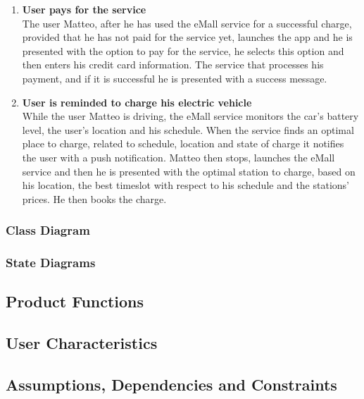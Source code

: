 \begin{enumerate}
    \item \textbf{User pays for the service}\\
    The user Matteo, after he has used the eMall service for a successful charge, provided that he has not paid for the service yet,
    launches the app and he is presented with the option to pay for the service, 
    he selects this option and then enters his credit card information.
    The service that processes his payment, and if it is successful he is presented with a success message.
    \item \textbf{User is reminded to charge his electric vehicle}\\
    While the user Matteo is driving, the eMall service monitors the car's battery level, the user's location and his schedule. 
    When the service finds an optimal place to charge, related to schedule, location and state of charge it notifies the user with a push notification.
    Matteo then stops, launches the eMall service and then he is presented with the optimal station to charge, based on his location, the best timeslot with respect to his schedule and the stations' prices. He then books the charge.
\end{enumerate}
\subsubsection{Class Diagram}

\subsubsection{State Diagrams}
\subsection{Product Functions}
\subsection{User Characteristics}
\subsection{Assumptions, Dependencies and Constraints}